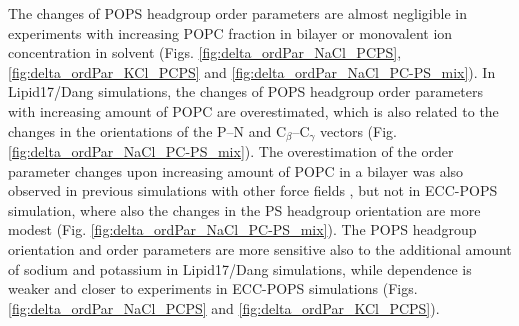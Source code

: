 \documentclass[journal=jpcbfk,manuscript=article]{achemso}
\begin{document}
% 
The changes of POPS headgroup order parameters are almost negligible in experiments with increasing POPC fraction in bilayer
or monovalent ion concentration in solvent
(Figs. \ref{fig:delta_ordPar_NaCl_PCPS}, \ref{fig:delta_ordPar_KCl_PCPS} and \ref{fig:delta_ordPar_NaCl_PC-PS_mix}).
In Lipid17/Dang simulations, the changes of POPS headgroup order parameters with increasing amount of POPC
are overestimated, which is also related to the changes in the orientations of the P--N and C$_{\beta}$--C$_{\gamma}$
vectors (Fig. \ref{fig:delta_ordPar_NaCl_PC-PS_mix}). The overestimation of the order parameter changes
upon increasing amount of POPC in a bilayer 
was also observed in previous simulations with other force fields \cite{NMRlipidsIV}, but not in
ECC-POPS simulation, where also the changes in the PS headgroup orientation are more modest (Fig. \ref{fig:delta_ordPar_NaCl_PC-PS_mix}).
The POPS headgroup orientation and order parameters are more sensitive also to the additional amount
of sodium and potassium in Lipid17/Dang simulations, while dependence is weaker and closer to experiments
in ECC-POPS simulations (Figs. \ref{fig:delta_ordPar_NaCl_PCPS} and \ref{fig:delta_ordPar_KCl_PCPS}).
\end{document}
